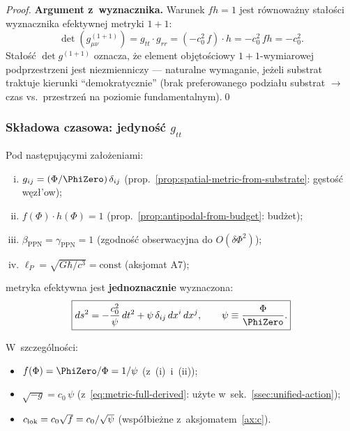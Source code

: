 \begin{proof}
\smallskip\noindent
\textbf{Argument z~wyznacznika.}
Warunek $fh = 1$ jest r\'ownowa\.zny sta\l{}o\'sci
wyznacznika efektywnej metryki $1{+}1$:
\begin{equation}
  \det(g_{\mu\nu}^{(1+1)})
  = g_{tt}\cdot g_{rr}
  = (-c_0^2\, f)\cdot h
  = -c_0^2\,fh = -c_0^2.
\end{equation}
Sta\l{}o\'s\'c $\det g^{(1+1)}$ oznacza, \.ze element
obj\k{e}to\'sciowy $1{+}1$-wymiarowej podprzestrzeni
jest niezmienniczy --- naturalne wymaganie,
je\.zeli substrat traktuje kierunki ``demokratycznie''
(brak preferowanego podzia\l{}u substrat $\to$ czas vs.\ przestrze\'n
na poziomie fundamentalnym).\qed
\end{proof}

\subsubsection{Sk\l{}adowa czasowa: jedyno\'s\'c $g_{tt}$}%
\label{sssec:g00-uniqueness}

\begin{theorem}%
\label{thm:metric-from-substrate-full}
Pod nast\k{e}puj\k{a}cymi za\l{}o\.zeniami:
\begin{enumerate}[(i),nosep]
  \item $g_{ij} = (\Phi/\PhiZero)\,\delta_{ij}$
        \hfill(prop.~\ref{prop:spatial-metric-from-substrate}: g\k{e}sto\'s\'c
        w\k{e}z\l{}'ow);
  \item $f(\Phi)\cdot h(\Phi) = 1$
        \hfill(prop.~\ref{prop:antipodal-from-budget}: bud\.zet);
  \item $\beta_{\mathrm{PPN}} = \gamma_{\mathrm{PPN}} = 1$
        \hfill(zgodno\'s\'c obserwacyjna do $O(\delta\Phi^2)$);
  \item $\ell_P = \sqrt{G\hbar/c^3} = \text{const}$
        \hfill(aksjomat A7);
\end{enumerate}
metryka efektywna jest \textbf{jednoznacznie} wyznaczona:
\begin{equation}\label{eq:metric-full-derived}
  \boxed{
    ds^2 = -\frac{c_0^2}{\psi}\,dt^2
         + \psi\,\delta_{ij}\,dx^i\,dx^j,
    \qquad \psi \equiv \frac{\Phi}{\PhiZero}.
  }
\end{equation}

W~szczeg\'olno\'sci:
\begin{itemize}[nosep]
  \item $f(\Phi) = \PhiZero/\Phi = 1/\psi$ \quad(z~(i)~i~(ii));
  \item $\sqrt{-g} = c_0\,\psi$
        \quad(z~\eqref{eq:metric-full-derived}: u\.zyte w~sek.~\ref{ssec:unified-action});
  \item $c_{\rm lok} = c_0\sqrt{f} = c_0/\sqrt{\psi}$
        \quad(wsp\'o\l{}bieżne z~aksjomatem~\ref{ax:c}).
\end{itemize}
\end{theorem}

